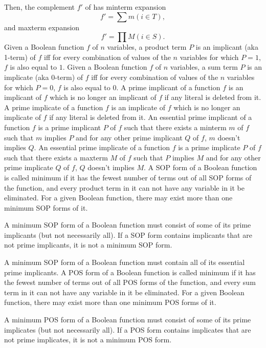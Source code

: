 \documentclass[a4paper,12pt]{article}
\begin{document}
\begin{itemize}
\begin{itemize}
\begin{itemize}
\begin{itemize}
\begin{itemize}
\begin{itemize}
\begin{itemize}
Then, the complement $f'$ of has minterm expansion 
\[f'=\sum m(i\in T),\]
and maxterm expansion
\[f'=\prod M(i\in S).\]
Given a Boolean function $f$ of $n$ variables, a product term $P$ is an implicant (aka 1-term) of $f$ iff for every combination of values of the $n$ variables for which $P = 1$, $f$ is also equal to $1$.
Given a Boolean function $f$ of $n$ variables, a sum term $P$ is an implicate (aka 0-term) of $f$ iff for every combination of values of the $n$ variables for which $P = 0$, $f$ is also equal to $0$.
A prime implicant of a function $f$ is an implicant of $f$ which is no longer an implicant of $f$ if any literal is deleted from it.
A prime implicate of a function $f$ is an implicate of $f$ which is no longer an implicate of $f$ if any literal is deleted from it.
An essential prime implicant of a function $f$ is a prime implicant $P$ of $f$ such that there exists a minterm $m$ of $f$ such that $m$ implies $P$ and for any other prime implicant $Q$ of $f$, $m$ doesn't implies $Q$.
An essential prime implicate of a function $f$ is a prime implicate $P$ of $f$ such that there exists a maxterm $M$ of $f$ such that $P$ implies $M$ and for any other prime implicate $Q$ of $f$, $Q$ doesn't implies $M$.
A SOP form of a Boolean function is called minimum if it has the fewest number of terms out of all SOP forms of the function, and every product term in it can not have any variable in it be eliminated. For a given Boolean function, there may exist more than one minimum SOP forms of it.

A minimum SOP form of a Boolean function must consist of some of its prime implicants (but not necessarily all). If a SOP form contains implicants that are not prime implicants, it is not a minimum SOP form.

A minimum SOP form of a Boolean function must contain all of its essential prime implicants.
A POS form of a Boolean function is called minimum if it has the fewest number of terms out of all POS forms of the function, and every sum term in it can not have any variable in it be eliminated. For a given Boolean function, there may exist more than one minimum POS forms of it.

A minimum POS form of a Boolean function must consist of some of its prime implicates (but not necessarily all). If a POS form contains implicates that are not prime implicates, it is not a minimum POS form.


\end{itemize}
\end{itemize}
\end{itemize}
\end{itemize}
\end{itemize}
\end{itemize}
\end{itemize}
\end{document}
